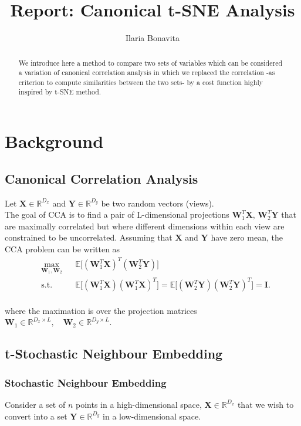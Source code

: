 \documentclass[11pt]{article}
\title{Report: Canonical t-SNE Analysis}
\author{Ilaria Bonavita}
\begin{document}
\maketitle
\begin{abstract}
We introduce here a method to compare two sets of variables which can be considered a variation of canonical correlation analysis in which we replaced the correlation -as criterion to compute similarities between the two sets- by a cost function highly inspired by t-SNE method.
\end{abstract}

\section{Background}
\subsection{Canonical Correlation Analysis}
Let $\mathbf{X}\in \mathbb{R}^{D_x}$ and $\mathbf{Y}\in \mathbb{R}^{D_y}$  be two random vectors (views).
\\
The goal of CCA is to find a pair of L-dimensional projections $\mathbf{W}_1^T\mathbf{X}$, $\mathbf{W}_2^T\mathbf{Y}$ that are maximally correlated but where different dimensions within each view are constrained to be uncorrelated. Assuming that   $\mathbf{X}$ and $\mathbf{Y}$ have zero mean, the CCA problem can be written as
\\

\begin{equation}\label{cca}
\begin{aligned}
& \underset{\mathbf{W}_1,\mathbf{W}_2}{\text{max}}
& & \mathbb{E}\big[ (\mathbf{W}_1^T \mathbf{X})^T( \mathbf{W}_2^T \mathbf{Y}) \big]\\
& \text{s.t.}
& & \mathbb{E}\big[ (\mathbf{W}_1^T \mathbf{X})( \mathbf{W}_1^T \mathbf{X})^T \big]=\mathbb{E}\big[ (\mathbf{W}_2^T \mathbf{Y})( \mathbf{W}_2^T \mathbf{Y})^T \big]=\mathbf{I}.
\end{aligned}
\end{equation}
\\
where the maximation is over the projection matrices $\mathbf{W}_1\in \mathbb{R}^{D_x \times L},\quad \mathbf{W}_2 \in \mathbb{R}^{D_y \times L}$.

\subsection{t-Stochastic Neighbour Embedding}
\subsubsection{Stochastic Neighbour Embedding}
Consider a set of $n$ points in a high-dimensional space, $\mathbf{X}\in \mathbb{R}^{D_x}$ that we wish to convert into a set  $\mathbf{Y}\in \mathbb{R}^{D_y}$  in a low-dimensional space.
\\
\end{document}
